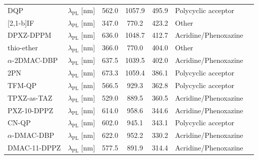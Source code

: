 {\begin{longtable}{l l S[table-format=3.4] S[table-format=4.4] S[table-format=4.4] l l}
DQP                                 & $\lambda_{\text{PL}}$ [nm] & 562.0 & 1057.9 &   495.9 & Polycyclic acceptor    &  \\
{[2,1-b]IF}                           & $\lambda_{\text{PL}}$ [nm] & 347.0 &  770.2 &   423.2 & Other                  &  \\
DPXZ-DPPM                           & $\lambda_{\text{PL}}$ [nm] & 636.0 & 1048.7 &   412.7 & Acridine/Phenoxazine   &  \\
thio-ether                          & $\lambda_{\text{PL}}$ [nm] & 366.0 &  770.0 &   404.0 & Other                  &  \\
$\alpha$-2DMAC-DBP                  & $\lambda_{\text{PL}}$ [nm] & 637.5 & 1039.5 &   402.0 & Acridine/Phenoxazine   &  \\
2PN                                 & $\lambda_{\text{PL}}$ [nm] & 673.3 & 1059.4 &   386.1 & Polycyclic acceptor    &  \\
TFM-QP                              & $\lambda_{\text{PL}}$ [nm] & 566.5 &  929.3 &   362.8 & Polycyclic acceptor    &  \\
TPXZ-as-TAZ                         & $\lambda_{\text{PL}}$ [nm] & 529.0 &  889.5 &   360.5 & Acridine/Phenoxazine   &  \\
PXZ-10-DPPZ                         & $\lambda_{\text{PL}}$ [nm] & 614.0 &  958.6 &   344.6 & Acridine/Phenoxazine   &  \\
CN-QP                               & $\lambda_{\text{PL}}$ [nm] & 602.0 &  945.1 &   343.1 & Polycyclic acceptor    &  \\
$\alpha$-DMAC-DBP                   & $\lambda_{\text{PL}}$ [nm] & 622.0 &  952.2 &   330.2 & Acridine/Phenoxazine   &  \\
DMAC-11-DPPZ                        & $\lambda_{\text{PL}}$ [nm] & 577.5 &  891.9 &   314.4 & Acridine/Phenoxazine   &  \\


\end{longtable}}
